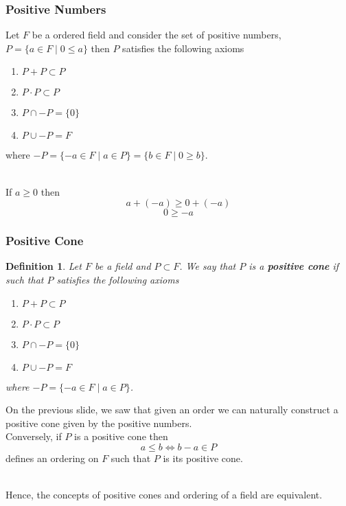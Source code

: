 \documentclass{beamer}
\def\jump{ \quad \\ \vspace{0.5cm} \pause}
\theoremstyle{thmstyle}
\newtheorem*{mydef}{Definition}
\theoremstyle{mystyle}
\theoremstyle{qstnstyle}
\begin{document}
\begin{frame}[t]
\frametitle{Positive Numbers}
Let $F$ be a ordered field and consider the set of positive numbers, $P=\{a\in F \mid 0 \leq a \}$ then $P$ satisfies the following axioms
\jump
\begin{enumerate}
\item $P+P\subset P$
\item $P \cdot P \subset P $
\item $P \cap -P = \{0 \} $
\item $P \cup -P=F$
\end{enumerate}
where $-P=\{-a\in F \mid a\in P \}=\{b\in F \mid 0 \geq b \}$.

\jump
If $a\geq 0 $ then \pause  
$$a+(-a) \geq 0+(-a)$$
$$0\geq -a $$
\end{frame}

\begin{frame}[t]
\frametitle{Positive Cone}

\begin{mydef}
Let $F$ be a field and $P \subset F$. We say that $P$ is a \textbf{positive cone} if such that $P$ satisfies the following axioms
\begin{enumerate}
\item $P+P\subset P$
\item $P \cdot P \subset P $
\item $P \cap -P = \{0 \} $
\item $P \cup -P=F$
\end{enumerate}
where $-P=\{-a\in F \mid a\in P \}$. 
\end{mydef}

\pause
On the previous slide, we saw that given an order we can naturally construct a positive cone given by the positive numbers. 
\jump 
Conversely, if $P$ is a positive cone then 
$$a \leq b \iff b-a \in P $$
defines an ordering on $F$ such that $P$ is its positive cone. 

\jump 
Hence, the concepts of positive cones and ordering of a field are equivalent.
\end{frame}
\end{document}
